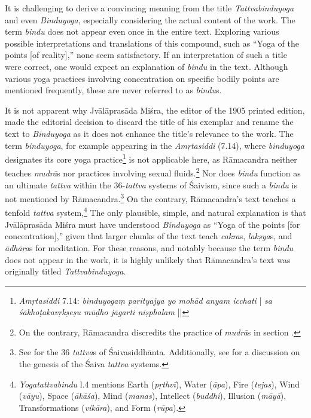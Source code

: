 It is challenging to derive a convincing meaning from the title \emph{Tattvabinduyoga} and even \emph{Binduyoga}, especially considering the actual content of the work. The term \textit{bindu} does not appear even once in the entire text. Exploring various possible interpretations and translations of this compound, such as ``Yoga of the points [of reality],'' none seem satisfactory. If an interpretation of such a title were correct, one would expect an explanation of \textit{bindu} in the text. Although various yoga practices involving concentration on specific bodily points are mentioned frequently, these are never referred to as \textit{bindu}s.

It is not apparent why Jvālāprasāda Miśra, the editor of the 1905 printed edition, made the editorial decision to discard the title of his exemplar and rename the text to \emph{Binduyoga} as it does not enhance the title's relevance to the work. The term \textit{binduyoga}, for example appearing in the \emph{Amṛtasiddi} (7.14), where \textit{binduyoga} designates its core yoga practice\footnote{\emph{Amṛtasiddi} 7.14: \textit{binduyogaṃ parityajya yo mohād anyam icchati} | \textit{sa śākhoṭakavṛkṣeṣu mūḍho jāgarti niṣphalam} ||} is not applicable here, as Rāmacandra neither teaches \textit{mudrā}s nor practices involving sexual fluids.\footnote{On the contrary, Rāmacandra discredits the practice of \textit{mudrā}s in section .} Nor does \textit{bindu} function as an ultimate \textit{tattva} within the 36-\textit{tattva} systems of Śaivism, since such a \textit{bindu} is not mentioned by Rāmacandra.\footnote{See \citeauthor[1996: 177]{gengnagel1996} for the 36 \textit{tattva}s of Śaivasiddhānta. Additionally, see \citeauthor[2016: 77 et seqq.]{goodall2016tattvas} for a discussion on the genesis of the Śaiva \textit{tattva} systems.} On the contrary, Rāmacandra's text teaches a tenfold \textit{tattva} system,\footnote{\emph{Yogatattvabindu}  l.4 mentions Earth (\textit{pṛthvī}), Water (\textit{āpa}), Fire (\textit{tejas}), Wind (\textit{vāyu}), Space (\textit{ākāśa}), Mind (\textit{manas}), Intellect (\textit{buddhi}), Illusion (\textit{māyā}), Transformations (\textit{vikāra}), and Form (\textit{rūpa}).} The only plausible, simple, and natural explanation is that Jvālāprasāda Miśra must have understood \emph{Binduyoga} as ``Yoga of the points [for concentration],'' given that larger chunks of the text teach \textit{cakra}s, \textit{lakṣya}s, and \textit{ādhāra}s for meditation. For these reasons, and notably because the term \textit{bindu} does not appear in the work, it is highly unlikely that Rāmacandra's text was originally titled \emph{Tattvabinduyoga}.


